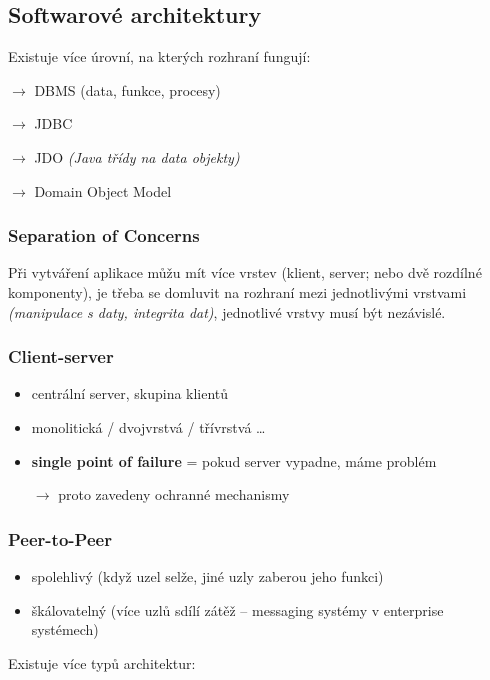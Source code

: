 \subsection{Softwarové architektury}

Existuje více úrovní, na kterých rozhraní fungují:

$\to$ DBMS (data, funkce, procesy)

$\to$ JDBC

$\to$ JDO \textit{(Java třídy na data objekty)}

$\to$ Domain Object Model

\subsubsection*{Separation of Concerns}

Při vytváření aplikace můžu mít více vrstev (klient, server; nebo dvě rozdílné komponenty), je třeba se domluvit na rozhraní mezi jednotlivými vrstvami \textit{(manipulace s daty, integrita dat)}, jednotlivé vrstvy musí být nezávislé.

\subsubsection*{Client-server}

\begin{itemize}
    \item centrální server, skupina klientů
    \item monolitická / dvojvrstvá / třívrstvá \ldots
    \item \textbf{single point of failure} = pokud server vypadne, máme problém
    
    $\to$ proto zavedeny ochranné mechanismy
\end{itemize}

\subsubsection*{Peer-to-Peer}

\begin{itemize}
    \item spolehlivý (když uzel selže, jiné uzly zaberou jeho funkci)
    \item škálovatelný (více uzlů sdílí zátěž -- messaging systémy v enterprise systémech)
\end{itemize}

\vspace{4pt}
\noindent Existuje více typů architektur:

